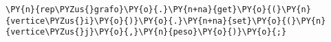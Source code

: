 \begin{Verbatim}[commandchars=\\\{\}]
\PY{n}{rep\PYZus{}grafo}\PY{o}{.}\PY{n+na}{get}\PY{o}{(}\PY{n}{vertice\PYZus{}i}\PY{o}{)}\PY{o}{.}\PY{n+na}{set}\PY{o}{(}\PY{n}{vertice\PYZus{}j}\PY{o}{,}\PY{n}{peso}\PY{o}{)}\PY{o}{;}
\end{Verbatim}
